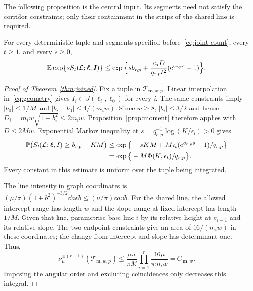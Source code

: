 \documentclass[11pt,letterpaper]{article}
\begin{document}
The following proposition is the central input. Its segments need not satisfy the corridor constraints; only their containment in the strips of the shared line is required.

\begin{proposition}\label{prop:moment}
For every deterministic tuple and segments specified before~\eqref{eq:joint-count}, every $t\ge1$, and every $s\ge0$,
\begin{equation}\label{eq:moment}
 \mathbb E\exp\{sS_t(\mathcal L;\boldsymbol\ell,\boldsymbol I)\}
 \le\exp\Big\{s b_{r,p}
       +\frac{c_\mu D}{q_{r,p}t^2}
                        (\mathrm{e}^{q_{r,p}s}-1)\Big\}.
\end{equation}
\end{proposition}

\begin{proof}[Proof of Theorem~\ref{thm:joined}]
Fix a tuple in $\mathcal T_{\boldsymbol m,w,p}$. Linear interpolation in~\eqref{eq:geometry} gives $I_i\subset J(\ell_i,\ell_0)$ for every $i$. The same constraints imply $|b_0|\le1/M$ and $|b_i-b_0|\le4/(m_iw)$. Since $w\ge8$, $|b_i|\le3/2$ and hence $D_i=m_iw\sqrt{1+b_i^2}\le2m_iw$. Proposition~\ref{prop:moment} therefore applies with $D\le2Mw$. Exponential Markov inequality at $s=q_{r,p}^{-1}\log(K/\epsilon_t)>0$ gives
\begin{equation}\label{eq:fixed-tail}
\begin{aligned}
 \mathbb P\big(S_t(\mathcal L;\boldsymbol\ell,\boldsymbol I)\ge b_{r,p}+KM\big)
 &\le\exp\big\{-sKM+M\epsilon_t
                      (\mathrm{e}^{q_{r,p}s}-1)/q_{r,p}\big\}\\
 &=\exp\big\{-M\Phi(K,\epsilon_t)/q_{r,p}\big\}.
\end{aligned}
\end{equation}
Every constant in this estimate is uniform over the tuple being integrated.

The line intensity in graph coordinates is $(\mu/\pi)(1+b^2)^{-3/2}\dd a\dd b\le(\mu/\pi)\dd a\dd b$. For the shared line, the allowed intercept range has length $w$ and the slope range at fixed intercept has length $1/M$. Given that line, parametrise base line $i$ by its relative height at $x_{i-1}$ and its relative slope. The two endpoint constraints give an area of $16/(m_iw)$ in these coordinates; the change from intercept and slope has determinant one. Thus,
\begin{equation}\label{eq:tuple-intensity}
 \nu_\mu^{\otimes(r+1)}(\mathcal T_{\boldsymbol m,w,p})
 \le\frac{\mu w}{\pi M}\prod_{i=1}^r\frac{16\mu}{\pi m_iw}
 =G_{\boldsymbol m,w}.
\end{equation}
Imposing the angular order and excluding coincidences only decreases this integral.


\end{proof}
\end{document}
